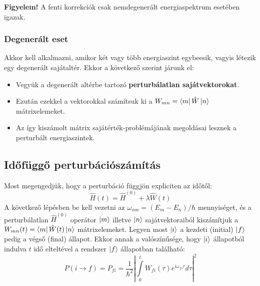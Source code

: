 \documentclass[12pt]{article}
\theoremstyle{plain}
\begin{document}
\textbf{Figyelem!} A fenti korrekciók csak nemdegenerált energiaspektrum esetében igazak.

\subsubsection{Degenerált eset}
Akkor kell alkalmazni, amikor két vagy több energiaszint egybeesik, vagyis létezik egy degenerált sajátaltér.
Ekkor a következő szerint járunk el:
\begin{itemize}
    \item Vegyük a degenerált altérbe tartozó \textbf{perturbálatlan sajátvektorokat}. 
    \item Ezután ezekkel a vektorokkal számítsuk ki a $W_{mn} = \bra m \hat W \ket n$ mátrixelemeket.
    \item Az így kiszámolt mátrix sajátérték-problémájának megoldásai lesznek a perturbált energiaszintek.
\end{itemize}
\subsection{Időfüggő perturbációszámítás}
Most megengedjük, hogy a perturbáció függjön expliciten az időtől:
\begin{equation}
    \hat H(t) = \hat H^{(0)} + \lambda\hat W(t)
\end{equation}
A következő lépésben be kell vezetni az $\omega_{mn} = (E_m-E_n)/\hbar$ mennyiséget, és a 
perturbálatlan $\hat H^{(0)}$ operátor $\ket m$ illetve $\ket n$ sajátvektoraiból kiszámítjuk
a $W_{mn}(t) = \bra m \hat W(t)\ket n$ mátrixelemeket. Legyen most $\ket i$ a kezdeti (initial) $\ket f$
pedig a végső (final) állapot. Ekkor annak a valószínűsége, hogy $\ket i$ állapotból indulva $t$
idő elteltével a rendszer $\ket f$ állapotban található:
\begin{equation}
    P(i\rightarrow f) = P_{fi} = \frac{1}{\hbar^2}\left|\int\limits_0^t W_{fi}(\tau) e^{i\omega_{fi}\tau} d\tau\right|^2   
\end{equation}
\end{document}
